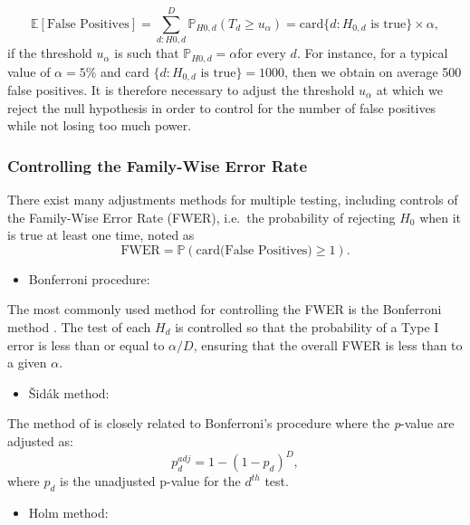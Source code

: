 \documentclass[]{book}
\providecommand{\tightlist}{%
  \setlength{\itemsep}{0pt}\setlength{\parskip}{0pt}}
\begin{document}
\[\mathbb{E}[\text{False Positives}] = \sum_{d:H{0,d}}^D \mathbb{P}_{H{0,d}}(T_d \geq u_{\alpha}) = \text{card} \lbrace d:H_{0,d} \text{ is true} \rbrace\times \alpha,\]
if the threshold \(u_{\alpha}\) is such that \(\mathbb{P}_{H{0,d}} = \alpha\)for every \(d\). For instance, for a typical value of \(\alpha = 5 \%\) and card \(\lbrace d:H_{0,d} \text{ is true} \rbrace =1000\), then we obtain on
average 500 false positives. It is therefore necessary to adjust the
threshold \(u_{\alpha}\) at which we reject the null hypothesis in order
to control for the number of false positives while not losing too much
power.

\hypertarget{controlling-the-family-wise-error-rate}{%
\subsubsection*{Controlling the Family-Wise Error Rate}\label{controlling-the-family-wise-error-rate}}

There exist many adjustments methods for multiple testing, including
controls of the Family-Wise Error Rate (FWER), i.e.~the probability of
rejecting \(H_0\) when it is true at least one time, noted as
\[\text{FWER} = \mathbb{P}(\text{card(False Positives)} \geq 1).\]

\begin{itemize}
\tightlist
\item
  Bonferroni procedure:
\end{itemize}

The most commonly used method for controlling the FWER is the
Bonferroni method \citep{bonferroni1936teoria}. The test of each \(H_d\) is
controlled so that the probability of a Type I error is less than or
equal to \(\alpha/D\), ensuring that the overall FWER is less than to
a given \(\alpha\).

\begin{itemize}
\tightlist
\item
  {Š}id{á}k method:
\end{itemize}

The method of \citep{sidak1967rectangular} is closely related to
Bonferroni's procedure where the \emph{p}-value are adjusted as:
\[p_d^{adj} = 1 - (1-p_d)^D,\] where \(p_d\) is the unadjusted p-value
for the \(d^{th}\) test.

\begin{itemize}
\tightlist
\item
  Holm method:
\end{itemize}
\end{document}
